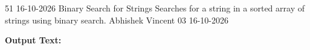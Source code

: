 \clearpage
\label{prog:51}
\programhead
  {51}
  {16-10-2026}
  {Binary Search for Strings}
  {Searches for a string in a sorted array of strings using binary search.}
  {Abhishek Vincent}
  {03}
  {16-10-2026}

\divider
\textbf{Output Text:}\par
\vspace{2pt}

